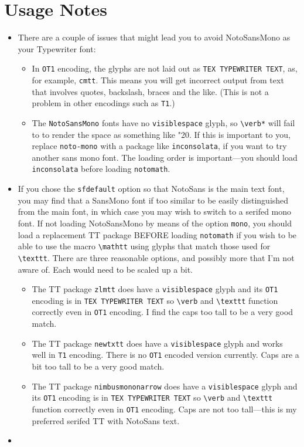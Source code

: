 \documentclass[]{article}
\begin{document}
\section*{Usage Notes}
\begin{itemize}
\item
 There are a couple of issues that might lead you to avoid NotoSansMono as your Typewriter font:
\begin{itemize}
\item
In {\tt OT1} encoding, the glyphs are not laid out as {\tt TEX TYPEWRITER TEXT}, as, for example, {\tt cmtt}. This means you will get incorrect output from text that involves quotes, backslash, braces and the like.  (This is not a problem in other encodings such as {\tt T1}.)
\item The {\tt NotoSansMono} fonts have no {\tt visiblespace} glyph, so \verb|\verb*| will fail to to render the space as something like {\char"20}. If this is important to you, replace {\tt noto-mono} with a package like {\tt inconsolata}, if you want to try another sans mono font. The loading order is important---you should load {\tt inconsolata} before loading {\tt notomath}.
\end{itemize}

\item
If you chose the {\tt sfdefault} option so that NotoSans is the main text font, you may find that a SansMono font if too similar to be easily distinguished from the main font, in which case you may wish to switch to a serifed mono font. If not loading NotoSansMono by means of the option {\tt mono}, you should load a replacement TT package BEFORE loading {\tt notomath} if you wish to be able to use the macro \verb|\mathtt| using glyphs that match those used for \verb|\texttt|. There are three reasonable options, and possibly more that I'm not aware of. Each would need to be scaled up a bit.
\begin{itemize}

\item The TT package {\tt zlmtt} does have a {\tt visiblespace} glyph and its {\tt OT1} encoding is in {\tt TEX TYPEWRITER TEXT} so \verb|\verb| and \verb|\texttt| function correctly even in {\tt OT1} encoding.  I find the caps too tall to be a very good match.
\item The TT package {\tt newtxtt} does have a {\tt visiblespace} glyph
and works well in {\tt T1} encoding. There is no {\tt OT1} encoded version currently. Caps are a bit too tall to be a very good match.
\item The TT package {\tt nimbusmononarrow} does have a {\tt visiblespace} glyph and its {\tt OT1} encoding is in {\tt TEX TYPEWRITER TEXT} so \verb|\verb| and \verb|\texttt| function correctly even in {\tt OT1} encoding. Caps are not too tall---this is my preferred serifed TT with NotoSans text.
\end{itemize}

\item 
\end{itemize}
\end{document}
